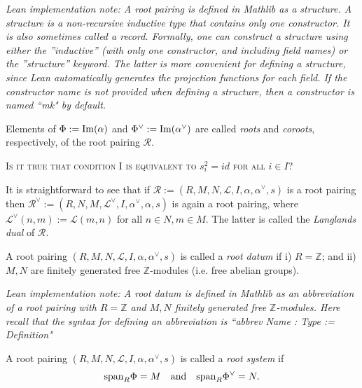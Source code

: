 {\it Lean implementation note: A root pairing is defined in Mathlib as a {\it structure}. A structure is a non-recursive inductive 
type that contains only one constructor. It is also sometimes called a {\it record}. Formally, one can construct a structure using either
the ''inductive'' (with only one constructor, and including field names) or the ''structure'' keyword. The latter is more convenient for defining a structure,
since Lean automatically generates the projection functions for each field. If the constructor name is not provided when defining a structure, then a 
constructor is named ``mk" by default.}

Elements of $\Phi := {\rm Im}(\alpha)$ and $\Phi^\vee := {\rm Im}(\alpha^\vee)$ are called {\it roots} and {\it coroots}, 
respectively, of the root pairing $\mathcal{R}$. 

\textsc{Is it true that condition I is equivalent to $s_i^2 = id$ for all $i \in I$?}

\begin{remark}
    \label{def:dual-root-pairing}
    \leanok
It is straightforward to see that if $\mathcal{R} := (R,M,N,\mathcal{L},I,\alpha, \alpha^\vee,s)$ is 
a root pairing then $\mathcal{R}^\vee := (R,N,M,\mathcal{L}^\vee,I,\alpha^\vee, \alpha,s)$ is again 
a root pairing, where $\mathcal{L}^\vee (n,m) := \mathcal{L}(m,n)$ for all $n \in N,m \in M$. The 
latter is called the {\it Langlands dual} of $\mathcal{R}$.
\end{remark}

\begin{definition}
    \label{def:root-datum}
    \leanok
     A root pairing $(R,M,N,\mathcal{L},I,\alpha, \alpha^\vee,s)$ is called a {\it root datum} if 
    i) $R = \mathbb{Z}$; and ii) $M,N$ are finitely generated free $\mathbb{Z}$-modules (i.e. free abelian groups).  
\end{definition}

{\it Lean implementation note: A root datum is defined in Mathlib as an abbreviation of 
a root pairing with $R = \mathbb{Z}$ and $M,N$ finitely generated free $\mathbb{Z}$-modules. Here 
recall that the syntax for defining an abbreviation is ``abbrev Name : Type := Definition"}

\begin{definition}
    \label{def:root-system}
    \leanok
    A root pairing $(R,M,N,\mathcal{L},I,\alpha, \alpha^\vee,s)$ is called a {\it root system} if
    \[
        {\rm span}_R \Phi = M \quad \text{and} \quad {\rm span}_R \Phi^\vee = N.
    \] 
\end{definition}

